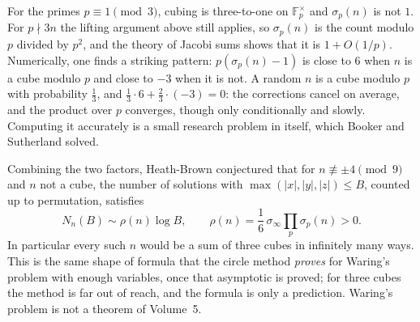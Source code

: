 For the primes $p\equiv1\pmod3$, cubing is three-to-one on $\mathbb F_p^\times$ and $\sigma_p(n)$ is not $1$. For $p\nmid3n$ the lifting argument above still applies, so $\sigma_p(n)$ is the count modulo $p$ divided by $p^2$, and the theory of Jacobi sums shows that it is $1+O(1/p)$. Numerically, one finds a striking pattern: $p(\sigma_p(n)-1)$ is close to $6$ when $n$ is a cube modulo $p$ and close to $-3$ when it is not. A random $n$ is a cube modulo $p$ with probability $\frac13$, and $\frac13\cdot6+\frac23\cdot(-3)=0$: the corrections cancel on average, and the product over $p$ converges, though only conditionally and slowly. Computing it accurately is a small research problem in itself, which Booker and Sutherland solved.

\begin{remark}\label{rem:hb}
Combining the two factors, Heath-Brown conjectured that for $n\not\equiv\pm4\pmod9$ and $n$ not a cube, the number of solutions with $\max(|x|,|y|,|z|)\le B$, counted up to permutation, satisfies
\[
N_n(B)\sim\rho(n)\log B,\qquad\rho(n)=\frac16\,\sigma_\infty\prod_p\sigma_p(n)>0.
\]
In particular every such $n$ would be a sum of three cubes in infinitely many ways. This is the same shape of formula that the circle method \emph{proves} for Waring's problem with
enough variables, once that asymptotic is proved; for three cubes the method is far out of reach, and the formula is only a prediction. Waring's problem is not a theorem of Volume~5.
\end{remark}
